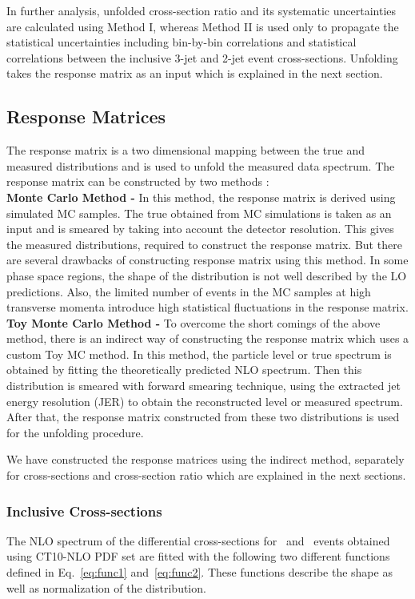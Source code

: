 In further analysis, unfolded cross-section ratio \ratio and its systematic uncertainties are calculated using Method I, whereas Method II is used only to propagate the statistical uncertainties including bin-by-bin correlations and statistical correlations between the inclusive 3-jet and 2-jet event cross-sections. Unfolding takes the response matrix as an input which is explained in the next section.

\subsection{Response Matrices}
\label{sec:funcs}
The response matrix is a two dimensional mapping between the true and measured distributions and is used to unfold the measured data spectrum. The response matrix can be constructed by two methods : \\ \newline
{\bf Monte Carlo Method -} In this method, the response matrix is derived using simulated MC samples. The true \httwo obtained from MC simulations is taken as an input and is smeared by taking into account the detector resolution. This gives the measured \httwo distributions, required to construct the response matrix. But there are several drawbacks of constructing response matrix using this method. In some phase space regions, the shape of the distribution is not well described by the LO predictions. Also, the limited number of events in the MC samples at high transverse momenta introduce high statistical fluctuations in the response matrix. \\ \newline
{\bf Toy Monte Carlo Method -} To overcome the short comings of the above method, there is an indirect way of constructing the response matrix which uses a custom Toy MC method. In this method, the particle level or true \httwo spectrum is obtained by fitting the theoretically predicted NLO spectrum. Then this distribution is smeared with forward smearing technique, using the extracted jet energy resolution (JER) to obtain the reconstructed level or measured \httwo spectrum. After that, the response matrix constructed from these two distributions is used for the unfolding procedure. 

We have constructed the response matrices using the indirect method, separately for cross-sections and cross-section ratio which are explained in the next sections.

\subsubsection{Inclusive Cross-sections}
\label{sec:cross_sec_res}
The NLO spectrum of the differential cross-sections for \njt~and \njth~events obtained using CT10-NLO PDF set are fitted with the following two different functions defined in Eq.~\ref{eq:func1} and~\ref{eq:func2}. These functions describe the shape as well as normalization of the distribution.

